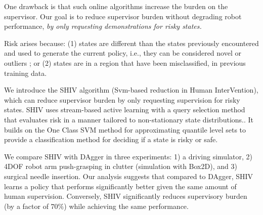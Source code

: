 \documentclass[10pt, conference]{ieeeconf}      %
\newcommand{\adnote}[1]{\ifthenelse{\boolean{include-notes}}%
 {\textcolor{green}{\textbf{AD: #1}}}{}}
\begin{document}
One drawback is that such online algorithms increase the burden on the supervisor. Our goal is to reduce supervisor burden without degrading robot performance, \emph{by only requesting demonstrations for risky states. }

Risk arises because:  (1) states are different than the states previously encountered and used to generate the current policy, i.e., they can be considered novel or outliers \cite{hodge2004survey}; or (2) states are in a region that have been misclassified, in previous training data.

We introduce the SHIV algorithm (Svm-based reduction in Human InterVention), which can reduce supervisor burden by only requesting supervision for risky states. SHIV uses stream-based active learning with a query selection method that evaluates risk in a manner tailored to non-stationary state distributions.. It builds on the One Class SVM method for approximating quantile level sets \cite{scholkopf2001estimating} to provide a classification method for deciding if a state is risky or safe.




We compare SHIV with DAgger in three experiments: 1) a driving simulator, 2) 4DOF robot arm push-grasping in clutter (simulation with Box2D), and 3) surgical needle insertion. Our analysis suggests that compared to DAgger, SHIV learns a policy that performs significantly better given the same amount of human supervision. Conversely, SHIV significantly reduces supervisory burden (by a factor of $70\%$) while achieving the same performance. 








\end{document}
